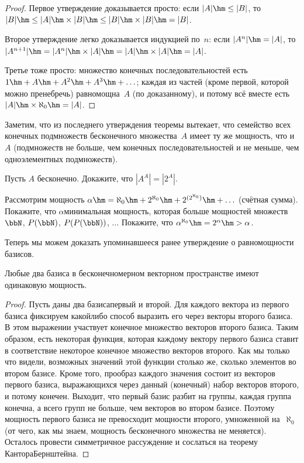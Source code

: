 \begin{proof}
Первое утверждение доказывается просто: если $|A|\hm\le |B|$,
то $|B|\hm\le |A|\hm\times |B| \hm\le |B|\hm\times |B| \hm= |B|$.

Второе утверждение легко доказывается индукцией
по~$n$: если
$|A^n|\hm=|A|$, то $|A^{n+1}|\hm=|A^n|\hm\times |A|\hm=|A|\hm\times |A|\hm=|A|$.

Третье тоже просто: множество конечных последовательностей
есть $1\hm+A\hm+A^2\hm+A^3\hm+\ldots$; каждая из
частей (кроме первой, которой можно пренебречь) равномощна~$A$
(по доказанному), и потому всё вместе
есть $|A|\hm\times\aleph_0\hm=|A|$.
\end{proof}

Заметим, что из последнего утверждения теоремы вытекает, что
семейство всех конечных подмножеств бесконечного множества~$A$
имеет ту же мощность, что и~$A$ (подмножеств не больше, чем
конечных последовательностей и не меньше, чем одноэлементных
подмножеств).

\begin{problem}
Пусть $A$ бесконечно. Докажите, что
$|A^A|=|2^A|$.
\end{problem}

\begin{problem}
Рассмотрим мощность
$\alpha\hm=\aleph_0\hm+2^{\aleph_0}\hm+2^{(2^{\aleph_0})}\hm+\ldots$
(счётная сумма). Покажите, что $\alpha$\т минимальная мощность,
которая больше мощностей множеств $\bbN$, $P(\bbN)$, $P(P(\bbN))$, $\dots$
Покажите, что $\alpha^{\aleph_0}\hm=2^{\alpha}\hm>\alpha$.
\end{problem}

Теперь мы можем доказать упоминавшееся ранее утверждение
о равномощности базисов.
\begin{theorem}
        \label{dimension-correctness}%
Любые два базиса в бесконечномерном векторном пространстве
имеют одинаковую мощность.
\end{theorem}

\begin{proof}
Пусть даны два базиса\т первый и второй. Для каждого вектора
из первого базиса фиксируем какой\Д либо\- способ выразить его
через векторы второго базиса. В этом выражении участвует
конечное множество векторов второго базиса. Таким образом,
есть некоторая функция, которая каждому вектору первого
базиса ставит в соответствие некоторое конечное множество
векторов второго. Как мы только что видели, возможных значений этой
функции столько же, сколько элементов во втором базисе.
Кроме того, прообраз каждого значения состоит из векторов
первого базиса, выражающихся через данный (конечный) набор векторов
второго, и потому конечен. Выходит, что первый базис
разбит на группы, каждая группа конечна, а всего групп не
больше, чем векторов во втором базисе. Поэтому
мощность первого базиса не превосходит мощности второго,
умноженной на~$\aleph_0$ (от чего, как мы знаем, мощность
бесконечного множества не меняется). Осталось провести симметричное
рассуждение и сослаться на теорему Кантора\ч Бернштейна.
\end{proof}
